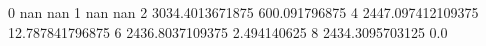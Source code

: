 0 nan nan
1 nan nan
2 3034.4013671875 600.091796875
4 2447.097412109375 12.787841796875
6 2436.8037109375 2.494140625
8 2434.3095703125 0.0
